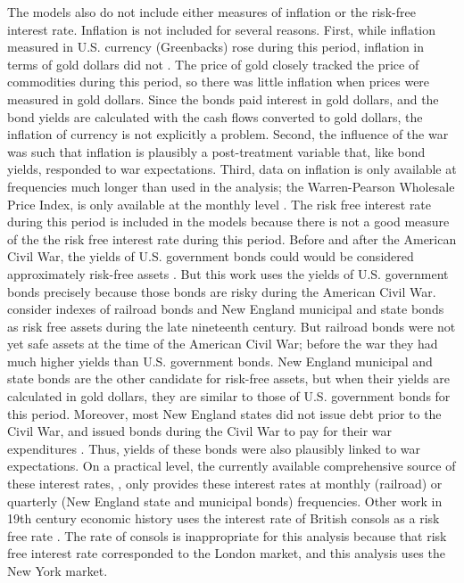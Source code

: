 The models also do not include either measures of inflation or the risk-free interest rate.
Inflation is not included for several reasons.
First, while inflation measured in U.S. currency (Greenbacks) rose during this period, inflation in terms of gold dollars did not \parencites{Mitchell1903}{Mitchell1908}.
The price of gold closely tracked the price of commodities during this period, so there was little inflation when prices were measured in gold dollars.
Since the bonds paid interest in gold dollars, and the bond yields are calculated with the cash flows converted to gold dollars, the inflation of currency is not explicitly a problem.
Second, the influence of the war was such that inflation is plausibly a post-treatment variable that, like bond yields, responded to war expectations.
Third, data on inflation is only available at frequencies much longer than used in the analysis; the Warren-Pearson Wholesale Price Index, is only available at the monthly level \parencite{WarrenPearson1933a}.
The risk free interest rate during this period is included in the models because there is not a good measure of the the risk free interest rate during this period.
Before and after the American Civil War, the yields of U.S. government bonds could would be considered approximately risk-free assets \parencites{HomerSylla2005}.
But this work uses the yields of U.S. government bonds precisely because those bonds are risky during the American Civil War.
\textcites{Macaulay1938}{HomerSylla2005} consider indexes of railroad bonds and New England municipal and state bonds as risk free assets during the late nineteenth century.
But railroad bonds were not yet safe assets at the time of the American Civil War; before the war they had much higher yields than U.S. government bonds.
New England municipal and state bonds are the other candidate for risk-free assets, but when their yields are calculated in gold dollars, they are similar to those of U.S. government bonds for this period.
Moreover, most New England states did not issue debt prior to the Civil War, and issued bonds during the Civil War to pay for their war expenditures \parencite[86--87]{Martin1871}.
Thus, yields of these bonds were also plausibly linked to war expectations.
On a practical level, the currently available comprehensive source of these interest rates, \textcite{Macaulay1938}, only provides these interest rates at monthly (railroad) or quarterly (New England state and municipal bonds) frequencies.
Other work in 19th century economic history uses the interest rate of British consols as a risk free rate \parencite{BordoRockoff1996a}.
The rate of consols is inappropriate for this analysis because that risk free interest rate corresponded to the  London market, and this analysis uses the New York market.



